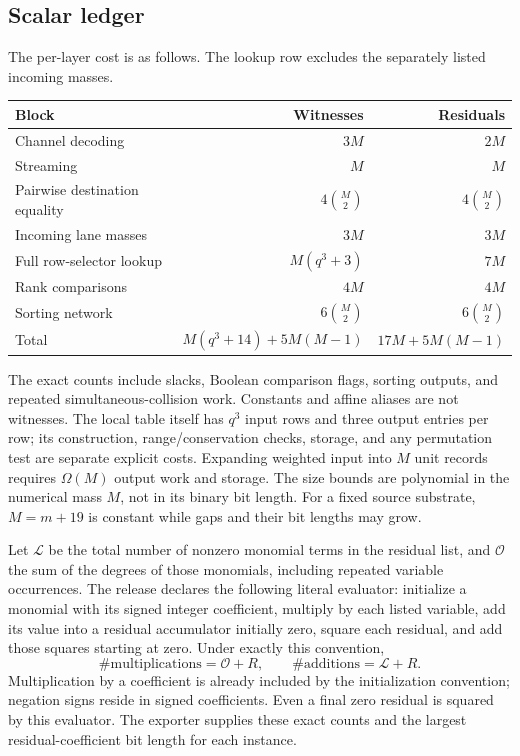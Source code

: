 \documentclass[11pt,letterpaper]{article}
\numberwithin{equation}{section}
\theoremstyle{definition}
\theoremstyle{remark}
\begin{document}
\subsection{Scalar ledger}
The per-layer cost is as follows. The lookup row excludes the separately listed incoming masses.
\begin{center}
\begin{tabular}{@{}lrr@{}}
\toprule
Block & Witnesses & Residuals\\\midrule
Channel decoding & $3M$ & $2M$\\
Streaming & $M$ & $M$\\
Pairwise destination equality & $4\binom M2$ & $4\binom M2$\\
Incoming lane masses & $3M$ & $3M$\\
Full row-selector lookup & $M(q^3+3)$ & $7M$\\
Rank comparisons & $4M$ & $4M$\\
Sorting network & $6\binom M2$ & $6\binom M2$\\\midrule
Total & $M(q^3+14)+5M(M-1)$ & $17M+5M(M-1)$\\\bottomrule
\end{tabular}
\end{center}
The exact counts include slacks, Boolean comparison flags, sorting outputs, and repeated simultaneous-collision work. Constants and affine aliases are not witnesses. The local table itself has $q^3$ input rows and three output entries per row; its construction, range/conservation checks, storage, and any permutation test are separate explicit costs. Expanding weighted input into $M$ unit records requires $\Omega(M)$ output work and storage. The size bounds are polynomial in the numerical mass $M$, not in its binary bit length. For a fixed source substrate, $M=m+19$ is constant while gaps and their bit lengths may grow.

Let $\mathcal L$ be the total number of nonzero monomial terms in the residual list, and $\mathcal O$ the sum of the degrees of those monomials, including repeated variable occurrences. The release declares the following literal evaluator: initialize a monomial with its signed integer coefficient, multiply by each listed variable, add its value into a residual accumulator initially zero, square each residual, and add those squares starting at zero. Under exactly this convention,
\begin{equation}\label{smc:sl:eq:ops}
 \#\mathrm{multiplications}=\mathcal O+R,
 \qquad \#\mathrm{additions}=\mathcal L+R.
\end{equation}
Multiplication by a coefficient is already included by the initialization convention; negation signs reside in signed coefficients. Even a final zero residual is squared by this evaluator. The exporter supplies these exact counts and the largest residual-coefficient bit length for each instance.
\end{document}
